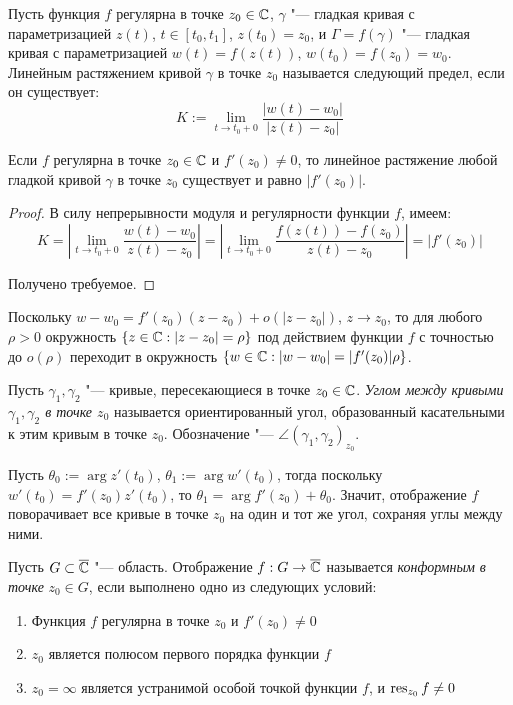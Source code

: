 \begin{definition}
	Пусть функция $f$ регулярна в точке $z_0 \in \mathbb{C}$, $\gamma$ "--- гладкая кривая с параметризацией $z(t)$, $t \in [t_0, t_1]$, $z(t_0) = z_0$, и $\Gamma = f(\gamma)$ "--- гладкая кривая с параметризацией $w(t) = f(z(t))$, $w(t_0) = f(z_0) = w_0$. Линейным растяжением кривой $\gamma$ в точке $z_0$ называется следующий предел, если он существует:
	\[K := \lim_{t \to t_0 + 0}\frac{|w(t) - w_0|}{|z(t) - z_0|}\]
\end{definition}

\begin{proposition}
	Если $f$ регулярна в точке $z_0 \in \mathbb{C}$ и $f'(z_0) \ne 0$, то линейное растяжение любой гладкой кривой $\gamma$ в точке $z_0$ существует и равно $|f'(z_0)|$.
\end{proposition}

\begin{proof}
	В силу непрерывности модуля и регулярности функции $f$, имеем:
	\[K = \left|\lim_{t \to t_0 + 0}\frac{w(t) - w_0}{z(t) - z_0}\right| = \left|\lim_{t \to t_0 + 0}\frac{f(z(t)) - f(z_0)}{z(t) - z_0}\right| = |f'(z_0)|\]
	
	Получено требуемое.
\end{proof}

\begin{note}
	Поскольку $w - w_0 = f'(z_0)(z-z_0) + o(|z - z_0|)$, $z \to z_0$, то для любого $\rho > 0$ окружность $\{z \in \mathbb{C} : |z - z_0| = \rho\}$ под действием функции $f$ с точностью до $o(\rho)$ переходит в окружность $\{w \in \mathbb{C} : |w - w_0| = |f'(z_0)|\rho\}$.
\end{note}

\begin{definition}
	Пусть $\gamma_1, \gamma_2$ "--- кривые, пересекающиеся в точке $z_0 \in \mathbb{C}$. \textit{Углом между кривыми $\gamma_1, \gamma_2$ в точке $z_0$} называется ориентированный угол, образованный касательными к этим кривым в точке $z_0$.  Обозначение "--- $\angle(\gamma_1, \gamma_2)_{z_0}$.
\end{definition}

\begin{note}
	Пусть $\theta_0 := \arg{z'(t_0)}$, $\theta_1 := \arg{w'(t_0)}$, тогда поскольку $w'(t_0) = f'(z_0)z'(t_0)$, то $\theta_1 = \arg{f'(z_0)} + \theta_0$. Значит, отображение $f$ поворачивает все кривые в точке $z_0$ на один и тот же угол, сохраняя углы между ними.
\end{note}

\begin{definition}
	Пусть $G \subset \overline{\mathbb{C}}$ "--- область. Отображение $f : G \to \overline{\mathbb{C}}$ называется \textit{конформным в точке} $z_0 \in G$, если выполнено одно из следующих условий:
	\begin{enumerate}
		\item Функция $f$ регулярна в точке $z_0$ и $f'(z_0) \ne 0$
		\item $z_0$ является полюсом первого порядка функции $f$
		\item $z_0 = \infty$ является устранимой особой точкой функции $f$, и $\operatorname*{res}_{z_0}f \ne 0$
	\end{enumerate}
\end{definition}

